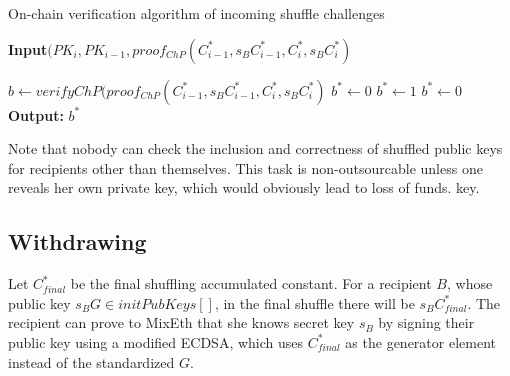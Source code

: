 \documentclass[conference, compsoc]{IEEEtran}
\theoremstyle{definition}
\begin{document}
\begin{algorithm}
	\caption{On-chain verification algorithm of incoming shuffle challenges}\label{verifyingshufflingoffchain}
	\hspace*{\algorithmicindent} \textbf{Input}$(PK_{i}, PK_{i-1}, proof_{ChP}(C^{*}_{i-1},s_{B}C^{*}_{i-1},C^{*}_{i},s_{B}C^{*}_{i})$ \\
	\begin{algorithmic}[1]
		\State $b\leftarrow verifyChP(proof_{ChP}(C^{*}_{i-1},s_{B}C^{*}_{i-1}, C^{*}_{i},s_{B}C^{*}_{i})$ 
		\State $b^*\leftarrow0$
		\State $b^*\gets 1$
		\Else
		\State $b^*\gets 0$
		\EndIf
		\hspace*{\algorithmicindent} \textbf{Output:} $b^{*}$ 
	\end{algorithmic}   
\end{algorithm}
Note that nobody can check the inclusion and correctness of shuffled public keys for recipients other than themselves. This task is non-outsourcable unless one reveals her own private key, which would obviously lead to loss of funds. key.  

\subsection{Withdrawing}
Let $C^*_{final}$ be the final shuffling accumulated constant. For a recipient $B$, whose public key $s_{B}G \in initPubKeys[]$, in the final shuffle there will be $s_{B}C^*_{final}$. The recipient can prove to MixEth that she knows secret key $s_{B}$ by signing their public key using a modified ECDSA, which uses $C^*_{final}$ as the generator element instead of the standardized $G$.
\end{document}
